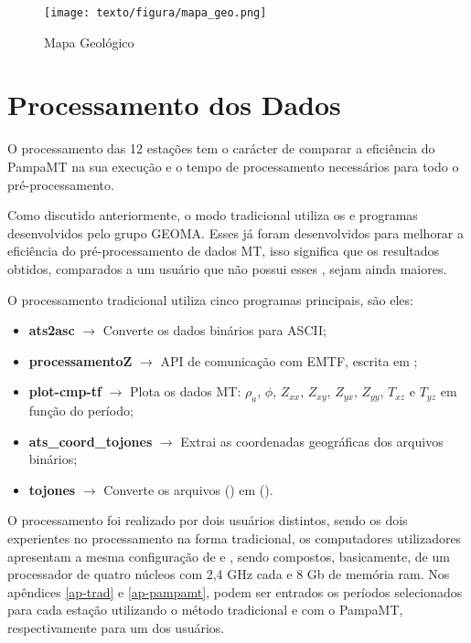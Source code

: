     \begin{figure}[H]
        \caption{Mapa Geológico}
            \begin{center}
                \texttt{[image: texto/figura/mapa\_geo.png]}
            \end{center}
        \label{local-bor}
    \end{figure}
        
    \section{Processamento dos Dados}
    
        O processamento das 12 estações tem o carácter de comparar a eficiência do PampaMT na sua execução e o tempo de processamento necessários para todo o pré-processamento.
        
        Como discutido anteriormente, o modo tradicional utiliza os  e programas desenvolvidos pelo grupo GEOMA. Esses  já foram desenvolvidos para melhorar a eficiência do pré-processamento de dados MT, isso significa que os resultados obtidos, comparados a um usuário que não possui esses , sejam ainda maiores.  
        
        O processamento tradicional utiliza cinco programas principais, são eles:
        
        \begin{itemize}
         \item \textbf{ats2asc} $\rightarrow$ Converte os dados binários para ASCII;
         \item \textbf{processamentoZ} $\rightarrow$ API de comunicação com EMTF, escrita em ;
         \item \textbf{plot-cmp-tf} $\rightarrow$ Plota os dados MT: $\rho_a$, $\phi$, $Z_{xx}$, $Z_{xy}$, $Z_{yx}$, $Z_{yy}$, $T_{xz}$ e $T_{yz}$ em função do período; 
         \item \textbf{ats\_coord\_tojones} $\rightarrow$ Extrai as coordenadas geográficas dos arquivos binários;
         \item \textbf{tojones} $\rightarrow$ Converte os arquivos  () em  ().
        \end{itemize}

        O processamento foi realizado por dois usuários distintos, sendo os dois experientes no processamento na forma tradicional, os computadores utilizadores apresentam a mesma configuração de  e , sendo compostos, basicamente, de um processador de quatro núcleos com 2,4 GHz cada e 8 Gb de memória ram. Nos apêndices \ref{ap-trad} e \ref{ap-pampamt}, podem ser entrados os períodos selecionados para cada estação utilizando o método tradicional e com o PampaMT, respectivamente para um dos usuários.
        
